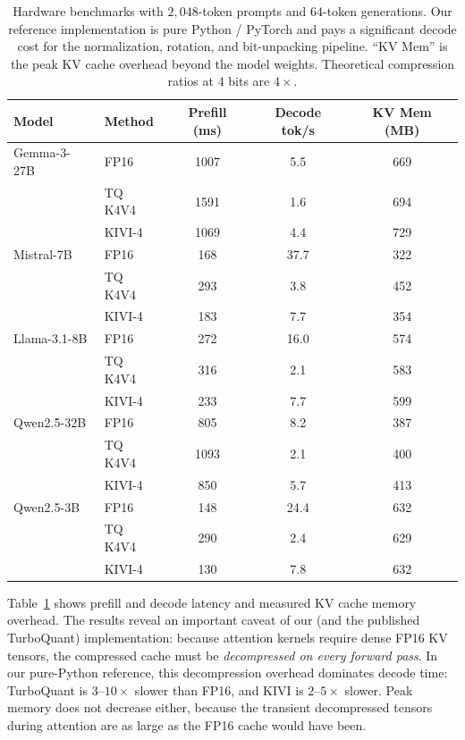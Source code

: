 \documentclass[11pt]{article}
\begin{document}
\begin{table}[t]
\centering
\caption{Hardware benchmarks with $2{,}048$-token prompts and $64$-token generations. Our reference implementation is pure Python / PyTorch and pays a significant decode cost for the normalization, rotation, and bit-unpacking pipeline. ``KV Mem'' is the peak KV cache overhead beyond the model weights. Theoretical compression ratios at $4$ bits are $4\times$.}
\label{tab:hw}
\small
\begin{tabular}{l l c c c}
\toprule
Model & Method & Prefill (ms) & Decode tok/s & KV Mem (MB) \\
\midrule
Gemma-3-27B & FP16 & 1007 & 5.5 & 669 \\
 & TQ K4V4 & 1591 & 1.6 & 694 \\
 & KIVI-4 & 1069 & 4.4 & 729 \\
\midrule
Mistral-7B & FP16 & 168 & 37.7 & 322 \\
 & TQ K4V4 & 293 & 3.8 & 452 \\
 & KIVI-4 & 183 & 7.7 & 354 \\
\midrule
Llama-3.1-8B & FP16 & 272 & 16.0 & 574 \\
 & TQ K4V4 & 316 & 2.1 & 583 \\
 & KIVI-4 & 233 & 7.7 & 599 \\
\midrule
Qwen2.5-32B & FP16 & 805 & 8.2 & 387 \\
 & TQ K4V4 & 1093 & 2.1 & 400 \\
 & KIVI-4 & 850 & 5.7 & 413 \\
\midrule
Qwen2.5-3B & FP16 & 148 & 24.4 & 632 \\
 & TQ K4V4 & 290 & 2.4 & 629 \\
 & KIVI-4 & 130 & 7.8 & 632 \\
\bottomrule
\end{tabular}
\end{table}

Table~\ref{tab:hw} shows prefill and decode latency and measured KV cache memory overhead. The results reveal an important caveat of our (and the published TurboQuant) implementation: because attention kernels require dense FP16 KV tensors, the compressed cache must be \emph{decompressed on every forward pass}. In our pure-Python reference, this decompression overhead dominates decode time: TurboQuant is $3$--$10\times$ slower than FP16, and KIVI is $2$--$5\times$ slower. Peak memory does not decrease either, because the transient decompressed tensors during attention are as large as the FP16 cache would have been.
\end{document}
